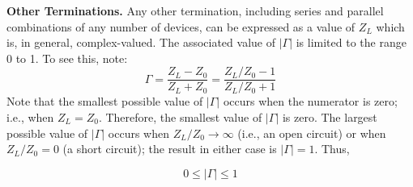 {\bf Other Terminations.}
Any other termination, including series and parallel combinations of any number of devices, can be expressed as a value of $Z_L$ which is, in general, complex-valued. 
The associated value of $\left|\Gamma\right|$ is limited to the range 0 to 1.
To see this, note:
%
\begin{equation}
\Gamma = \frac{Z_L-Z_0}{Z_L+Z_0} = \frac{Z_L/Z_0-1}{Z_L/Z_0+1}
\end{equation}
%
Note that the smallest possible value of $\left|\Gamma\right|$ occurs when the numerator is zero; i.e., when $Z_L=Z_0$.
Therefore, the smallest value of $\left|\Gamma\right|$ is zero.
The largest possible value of $\left|\Gamma\right|$ occurs when $Z_L/Z_0\rightarrow\infty$ (i.e., an open circuit) or when $Z_L/Z_0=0$ (a short circuit); the result in either case is $\left|\Gamma\right|=1$.
Thus,
%
\begin{mdframed}[backgroundcolor=yellow!20,nobreak=true] 
\begin{equation}
0\le\left|\Gamma\right|\le 1
\end{equation}
\end{mdframed}










